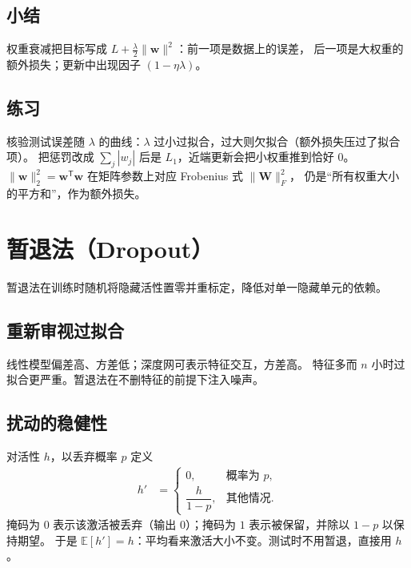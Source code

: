 \subsection{小结}

权重衰减把目标写成 $L+\frac{\lambda}{2}\|\bm{w}\|^{2}$：前一项是数据上的误差，
后一项是大权重的额外损失；更新中出现因子 $(1-\eta\lambda)$。

\subsection{练习}

核验测试误差随 $\lambda$ 的曲线：$\lambda$ 过小过拟合，过大则欠拟合（额外损失压过了拟合项）。
把惩罚改成 $\sum_{j}|w_{j}|$ 后是 $L_1$，近端更新会把小权重推到恰好 $0$。
$\|\bm{w}\|_{2}^{2}=\bm{w}^{\mathsf T}\bm{w}$ 在矩阵参数上对应 Frobenius 式 $\|\bm{W}\|_{F}^{2}$，
仍是“所有权重大小的平方和”，作为额外损失。

\section{暂退法（Dropout）}



暂退法在训练时随机将隐藏活性置零并重标定，降低对单一隐藏单元的依赖。

\subsection{重新审视过拟合}

线性模型偏差高、方差低；深度网可表示特征交互，方差高。
特征多而 $n$ 小时过拟合更严重。暂退法在不删特征的前提下注入噪声。

\subsection{扰动的稳健性}

对活性 $h$，以丢弃概率 $p$ 定义
\begin{align*}
h'
&=
\begin{cases}
0, & \text{概率为 }p,\\[0.3em]
\dfrac{h}{1-p}, & \text{其他情况}.
\end{cases}
\end{align*}
掩码为 $0$ 表示该激活被丢弃（输出 $0$）；掩码为 $1$ 表示被保留，并除以 $1-p$ 以保持期望。
于是 $\mathbb{E}[h']=h$：平均看来激活大小不变。测试时不用暂退，直接用 $h$。

